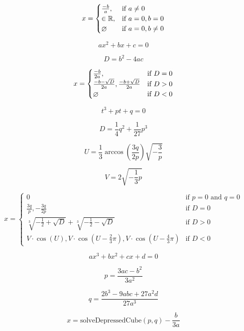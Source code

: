 \documentclass{article}
\begin{document}
\[
 x=
 \begin{cases}
  \frac{-b}{a}, & \text{if } a\ne0\\
  \in\mathbb{R}, & \text{if } a=0,b=0\\
  \o & \text{if } a=0,b\ne0
 \end{cases}
\]
\pagebreak

\[ax^{2}+bx+c=0\]
\pagebreak

\[D=b^{2}-4ac\]
\pagebreak

\[
 x=
  \begin{cases}
   \frac{-b}{2a}, & \text{if } D=0\\
   \frac{-b -\sqrt{D}}{2a}, \frac{-b +\sqrt{D}}{2a} & \text{if } D>0\\
   \o & \text{if } D<0
  \end{cases}
\]
\pagebreak

\[t^{3}+pt+q=0\]
\pagebreak

\[D=\frac{1}{4}q^{2}+\frac{1}{27}p^{3}\]
\pagebreak

\[U=\frac{1}{3}\arccos(\frac{3q}{2p})\sqrt{-\frac{3}{p}}\]
\pagebreak

\[V=2\sqrt{-\frac{1}{3}p}\]
\pagebreak

\[
 x=
  \begin{cases}
   0 & \text{if } p=0 \text{ and }q=0\\
   \frac{3q}{p}, -\frac{3q}{2p} & \text{if } D=0\\
   \sqrt[3]{-\frac{1}{2}+\sqrt{D}} + \sqrt[3]{-\frac{1}{2}-\sqrt{D}} & \text{if } D>0\\
   V\cdot \cos(U), V\cdot\cos(U-\frac{2}{3}\pi),V\cdot\cos(U-\frac{4}{3}\pi) & \text{if } D<0
  \end{cases}
\]
\pagebreak

\[ax^{3}+bx^{2}+cx+d=0\]
\pagebreak

\[p=\frac{3ac-b^{2}}{3a^{2}}\]
\pagebreak

\[q=\frac{2b^{3}-9abc+27a^{2}d}{27a^{3}}\]
\pagebreak

\[x=\text{solveDepressedCube}(p,q)-\frac{b}{3a}\]
\pagebreak
\end{document}

